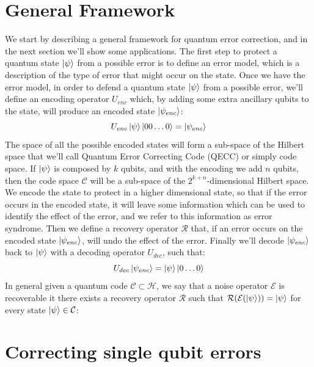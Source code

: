 \documentclass{article}
\begin{document}
	\section{General Framework}
	We start by describing a general framework for quantum error correction, and in the next section we'll show some applications. The first step to protect a quantum state $\ket{\psi}$ from a possible error is to define an error model, which is a description of the type of error that might occur on the state. Once we have the error model, in order to defend a quantum state $\ket{\psi}$ from a possible error, we'll define an encoding operator $U_{enc}$ which, by adding some extra ancillary qubits to the state, will produce an encoded state $\ket{\psi_{enc}}$:
	\[ U_{enc}\ket{\psi}\ket{00\dots0} = \ket{\psi_{enc}} \]
	The space of all the possible encoded states will form a sub-space of the Hilbert space that we'll call Quantum Error Correcting Code (QECC) or simply code space. If $\ket{\psi}$ is composed by $k$ qubits, and with the encoding we add $n$ qubits, then the code space $\mathcal{C}$ will be a sub-space of the $2^{k+n}$-dimensional Hilbert space. We encode the state to protect in a higher dimensional state, so that if the error occurs in the encoded state, it will leave some information which can be used to identify the effect of the error, and we refer to this information as error syndrome. Then we define a recovery operator $\mathcal{R}$ that, if an error occurs on the encoded state $\ket{\psi_{enc}}$, will undo the effect of the error. Finally we'll decode $\ket{\psi_{enc}}$ back to $\ket{\psi}$ with a decoding operator $U_{dec}$, such that:
	\[U_{dec}\ket{\psi_{enc}} = \ket{\psi}\ket{0\dots0}\]
	In general given a quantum code $\mathcal{C} \subset \mathcal{H}$, we say that a noise operator $\mathcal{E}$ is recoverable it there exists a recovery operator $\mathcal{R}$ such that $\mathcal{R(\mathcal{E}(\ket{\psi}))} = \ket{\psi}$ for every state $\ket{\psi} \in \mathcal{C}$:
		
	\section{Correcting single qubit errors}
\end{document}
